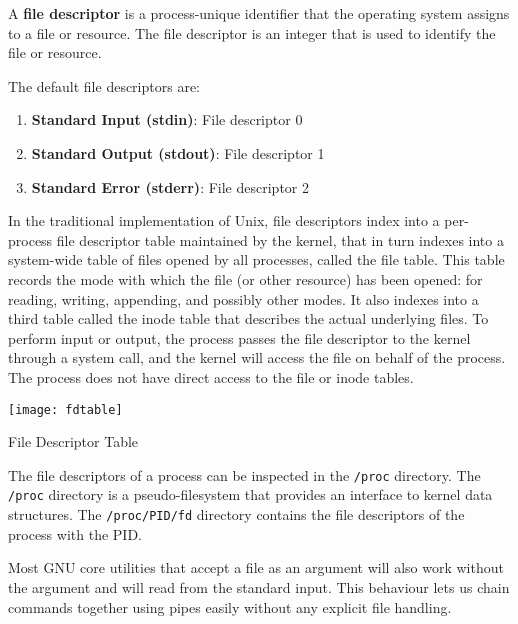 \begin{definition}
  A \textbf{file descriptor} is a process-unique identifier that the
  operating system assigns to a file or resource.
  The file descriptor is an integer that is used to identify
  the file or resource.
\end{definition}

The default file descriptors are:

\begin{enumerate}
  \item \textbf{Standard Input (stdin)}: File descriptor 0
  \item \textbf{Standard Output (stdout)}: File descriptor 1
  \item \textbf{Standard Error (stderr)}: File descriptor 2
\end{enumerate}

In the traditional implementation of Unix, file descriptors index
into a per-process file descriptor table maintained by the kernel,
that in turn indexes into a system-wide table of files opened by
all processes, called the file table. This table records the mode
with which the file (or other resource) has been opened: for
reading, writing, appending, and possibly other modes. It also indexes
into a third table called the inode table
that describes the actual
underlying files. To perform input or output, the process passes
the file descriptor to the kernel through a system call, and the
kernel will access the file on behalf of the process. The process
does not have direct access to the file or inode tables.

\begin{marginfigure}
  \texttt{[image: fdtable]}
  \caption{File Descriptor Table}
\end{marginfigure}

The file descriptors of a process can be inspected in the \lstinline|/proc|
directory. The \lstinline|/proc| directory is a pseudo-filesystem that
provides an interface to kernel data structures. The \lstinline|/proc/PID/fd|
directory contains the file descriptors of the process with the PID.

Most GNU core utilities that accept a file as an argument will also
work without the argument and will read from the standard input.
This behaviour lets us chain commands together using pipes easily
without any explicit file handling.

